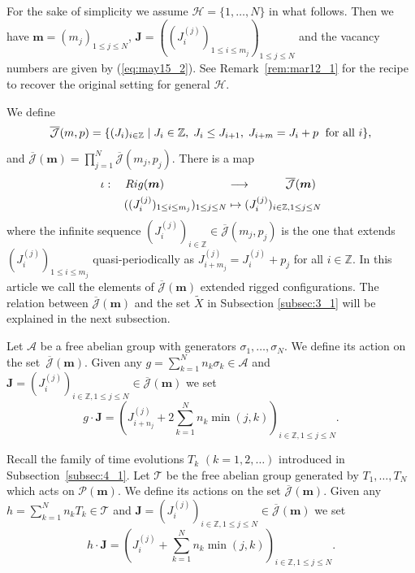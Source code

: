\documentclass[11pt]{article}
\newcommand{\Z}{{\mathbb Z}}
\newcommand{\J}{{\mathcal J}}
\newcommand{\Jb}{{\overline{\mathcal J}}}
\newcommand{\Rig}{{\rm Rig}}
\newcommand{\m}{{\boldsymbol m}}
\newcommand{\boJ}{{\boldsymbol J}}
\renewcommand{\H}{{\mathcal H}}
\begin{document}
For the sake of simplicity we assume $\H=\{1,\ldots,N\}$ in what follows.
Then we have $\m = (m_j)_{1 \leq j \leq N}$, $\boJ=((J^{(j)}_i)_{1 \le i \le m_{j}})_{1 \leq j \leq N}$
and the vacancy numbers are given by (\ref{eq:may15_2}).
See Remark~\ref{rem:mar12_1} for the recipe to recover the original setting for general $\H$.

We def\/ine
\begin{equation}
{\Jb} (m,p) = \{(J_i)_{i \in \Z} \mid
J_i \in \Z, \; J_i \le J_{i+1}, \; J_{i+m} = J_i + p\;
\hbox{ for all } i \},\label{eq:jcomp}
\end{equation}
and $\Jb (\m) = \prod_{j=1}^N {\Jb} (m_j,p_j)$.
There is a map
\begin{equation}\label{eq:iota}
\begin{split}
\iota : \quad
\Rig(\m) \qquad \quad\;\;
\qquad&\longrightarrow \qquad\quad
\Jb(\m)\\
((J^{(j)}_i)_{1 \le i \le m_{j}})_{1 \leq j \leq N}
&\mapsto
{(J^{(j)}_i)_{i \in \Z, 1 \leq j \leq N}}
\end{split}
\end{equation}
where the inf\/inite sequence $({J}^{(j)}_i)_{i \in \Z} \in {\Jb} (m_j,p_j)$
is the one that extends
$(J^{(j)}_i)_{1 \le i \le m_j}$ quasi-periodically as
${J}^{(j)}_{i+m_j}={J}^{(j)}_i+p_j$ for all $i \in \Z$.
{In this article we call the elements of $\Jb (\m)$ extended rigged conf\/igurations}.
{The relation between $\Jb (\m)$ and the set $\tilde{X}$ in Subsection \ref{subsec:3_1} will be explained in the next subsection.}

Let ${\mathcal A}$ be a free abelian group with generators $\sigma_1,\ldots,\sigma_N$.
We def\/ine its action
on the set~$\Jb (\m)$.
Given any $g = \sum_{k=1}^N n_k \sigma_k \in {\mathcal A}$ and
$\boJ = (J_i^{(j)})_{i \in \Z, 1 \leq j \leq N} \in \Jb (\m)$
we set
\begin{displaymath}
g \cdot \boJ = \left( J_{i+n_j}^{(j)} + 2 \sum_{k=1}^N n_k \min (j,k) \right)_{i \in \Z, 1 \leq j \leq N}.
\end{displaymath}


Recall the family of time evolutions $T_k$ $(k=1,2,\ldots)$ introduced in Subsection~\ref{subsec:4_1}.
Let ${\mathcal T}$ be the free abelian group generated by $T_1,\ldots,T_N$ which
acts on ${\mathcal P}(\m)$.
We def\/ine its actions on the set $\Jb (\m)$.
Given any $h = \sum_{k=1}^N n_k T_k \in {\mathcal T}$
and $\boJ = (J^{(j)}_i)_{i \in \Z, 1 \leq j \leq N} \in \Jb (\m)$
we set
\begin{displaymath}
h \cdot \boJ = \left( J_{i}^{(j)} + \sum_{k=1}^N n_k \min (j,k) \right)_{i \in \Z, 1 \leq j \leq N}.
\end{displaymath}
\end{document}
